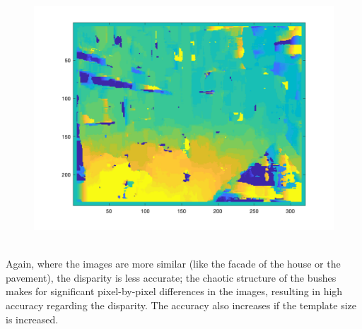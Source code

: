 \documentclass[12pt, a4paper]{article}
\begin{document}
\begin{figure}[H]
	\centering
	\includegraphics[width=\textwidth]{fig22.png}
\end{figure}
~\\
Again, where the images are more similar (like the facade of the house or the pavement), the disparity is less accurate; the chaotic structure of the bushes makes for significant pixel-by-pixel differences in the images, resulting in high accuracy regarding the disparity. The accuracy also increases if the template size is increased.
\end{document}
